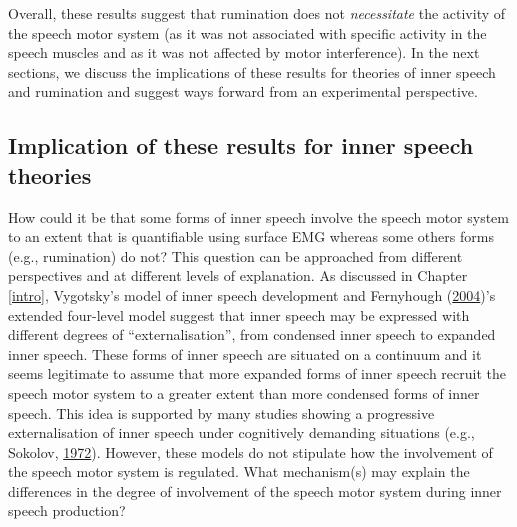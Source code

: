 \documentclass[a4paper,12pt,twoside,onecolumn,openright,final,oldfontcommands]{memoir}
\begin{document}
Overall, these results suggest that rumination does not \emph{necessitate} the activity of the speech motor system (as it was not associated with specific activity in the speech muscles and as it was not affected by motor interference). In the next sections, we discuss the implications of these results for theories of inner speech and rumination and suggest ways forward from an experimental perspective.

\hypertarget{implication-of-these-results-for-inner-speech-theories}{%
\subsection{Implication of these results for inner speech theories}\label{implication-of-these-results-for-inner-speech-theories}}

How could it be that some forms of inner speech involve the speech motor system to an extent that is quantifiable using surface EMG whereas some others forms (e.g., rumination) do not? This question can be approached from different perspectives and at different levels of explanation. As discussed in Chapter \ref{intro}, Vygotsky's model of inner speech development and Fernyhough (\protect\hyperlink{ref-fernyhough_alien_2004}{2004})'s extended four-level model suggest that inner speech may be expressed with different degrees of \enquote{externalisation}, from condensed inner speech to expanded inner speech. These forms of inner speech are situated on a continuum and it seems legitimate to assume that more expanded forms of inner speech recruit the speech motor system to a greater extent than more condensed forms of inner speech. This idea is supported by many studies showing a progressive externalisation of inner speech under cognitively demanding situations (e.g., Sokolov, \protect\hyperlink{ref-sokolov_inner_1972}{1972}). However, these models do not stipulate how the involvement of the speech motor system is regulated. What mechanism(s) may explain the differences in the degree of involvement of the speech motor system during inner speech production?
\end{document}
